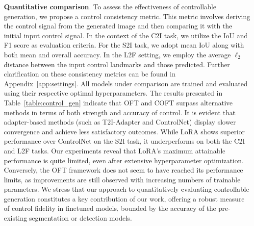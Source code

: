 \textbf{Quantitative comparison}. To assess the effectiveness of controllable generation, we propose a control consistency metric. This metric involves deriving the control signal from the generated image and then comparing it with the initial input control signal. In the context of the C2I task, we utilize the IoU and F1 score as evaluation criteria. For the S2I task, we adopt mean IoU along with both mean and overall accuracy. In the L2F setting, we employ the average $\ell_2$ distance between the input control landmarks and those predicted. Further clarification on these consistency metrics can be found in Appendix~\ref{app:settings}. All models under comparison are trained and evaluated using their respective optimal hyperparameters. The results presented in Table~\ref{table:control_gen} indicate that OFT and COFT surpass alternative methods in terms of both strength and accuracy of control. It is evident that adapter-based methods (such as T2I-Adapter and ControlNet) display slower convergence and achieve less satisfactory outcomes. While LoRA shows superior performance over ControlNet on the S2I task, it underperforms on both the C2I and L2F tasks. Our experiments reveal that LoRA’s maximum attainable performance is quite limited, even after extensive hyperparameter optimization. Conversely, the OFT framework does not seem to have reached its performance limits, as improvements are still observed with increasing numbers of trainable parameters. We stress that our approach to quantitatively evaluating controllable generation constitutes a key contribution of our work, offering a robust measure of control fidelity in finetuned models, bounded by the accuracy of the pre-existing segmentation or detection models.

